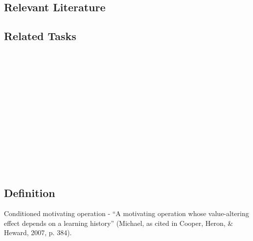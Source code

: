\subsection{Relevant Literature}
\begin{refsection}
\nocite{test,alang2017police,clayton2018black}
\printbibliography[heading=none]
\end{refsection}
%
\subsection{Related Tasks}
\fourdOne{}\\
\foureOne{}\\
\fouriTwo{}\\
\fourFKTwo{}\\
\fourFKThirteen{}\\
\fourFKFourteen{}\\
\fourFKSeventeen{}\\
\fourFKNineteen{}\\
\fourFKTwentySeven{}\\
\fourFKTwentyEight{}\\
\fourFKTwentyNine{}\\
\fourFKThirty{}\\
%
%
%
%
%
%
%
\section{\fourFKTwentySeven{}}
\subsection{Definition}
Conditioned motivating operation - ``A motivating operation whose value-altering effect depends on a learning history'' (Michael, as cited in Cooper, Heron, \& Heward, 2007, p. 384).\\

